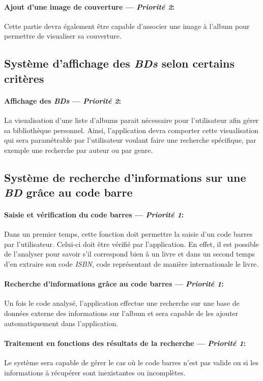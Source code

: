 \paragraph{Ajout d'une image de couverture ---  \textit{Priorité 2}:}  
Cette partie devra également être capable d'associer une image à l'album pour permettre de visualiser sa couverture.

\subsection{Système d'affichage des \emph{BDs} selon certains critères}

\paragraph{Affichage des \emph{BDs} ---  \textit{Priorité 2}:}

La visualisation d'une liste d'albums parait nécessaire pour l'utilisateur afin gérer sa bibliothèque personnel. Ainsi, l'application devra comporter cette visualisation qui sera paramétrable par l'utilisateur voulant faire une recherche spécifique, par exemple une recherche par auteur ou par genre.

\subsection{Système de recherche d'informations sur une \emph{BD}  grâce au code barre}

\paragraph{Saisie et vérification du code barres ---  \textit{Priorité 1}:}
Dans un premier temps, cette fonction doit permettre la saisie d'un code barres par l'utilisateur. 
Celui-ci doit être vérifié par l'application. En effet, il est possible de l'analyser pour savoir s'il correspond bien à un livre et dans un second temps d'en extraire son code \emph{ISBN}, code représentant de manière internationale le livre.
\paragraph{Recherche d'informations grâce au code barres ---  \textit{Priorité 1}:}  
Un fois le code analysé, l'application effectue une recherche sur une base de données externe des informations sur l'album et sera capable de les ajouter automatiquement dans l'application.
\paragraph{Traitement en fonctions des résultats de la recherche ---  \textit{Priorité 1}:}  
Le système sera capable de gérer le cas où le code barres n'est pas valide ou si les informations à récupérer sont inexistantes ou incomplètes.

